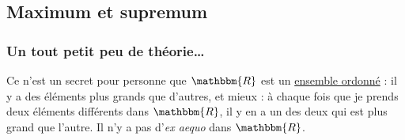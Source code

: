 \documentclass[a4paper,12pt]{book}
\newcommand{\eR}{\mathbbm{R}}
\theoremstyle{mes_exemples}	\newtheorem{exemple}[numtho]{Exemple}
\theoremstyle{mes_tho}
\begin{document}
\subsection{Maximum et supremum}

\subsubsection{Un tout petit peu de théorie\ldots}

Ce n'est un secret pour personne que $\eR$ est un \href{http://fr.wikipedia.org/wiki/Relation_d'ordre}{ensemble ordonné} : il y a des éléments plus grands que d'autres, et mieux : à chaque fois que je prends deux éléments différents dans $\eR$, il y en a un des deux qui est plus grand que l'autre. Il n'y a pas d'\emph{ex aequo} dans $\eR$.
\end{document}
